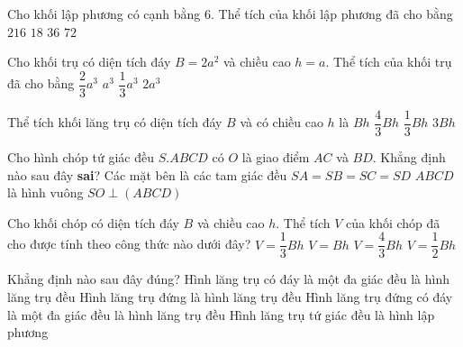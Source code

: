 \begin{ex}%
	 Cho khối lập phương có cạnh bằng $6$. Thể tích của khối lập phương đã cho bằng
	\choice 
		{\True $216$} 
		 {$18$}
		 {$36$}
		 {$72$}
\end{ex}

\begin{ex}%
	Cho khối trụ có diện tích đáy $B=2a^2$ và chiều cao $h=a$. Thể tích của khối trụ  đã cho bằng
	\choice 
		{$\dfrac{2}{3}a^3$} 
		 {$a^3$}
		{$\dfrac{1}{3}a^3$} 
		{\True  $2a^3$}
\end{ex}

\begin{ex}%
	Thể tích khối  lăng trụ có diện tích đáy $B$ và có chiều cao $h$ là
	 \choice
		{\True  $Bh$}
		 {$\dfrac{4}{3}Bh$}
		 {$\dfrac{1}{3}Bh$}
		{$3Bh$} 
\end{ex}

\begin{ex}%
	Cho hình chóp tứ giác đều $S.ABCD$ có $ O$ là giao điểm  $ AC$ và $BD$. Khẳng định nào sau đây \textbf{sai}?
	\choice 
		{\True Các mặt bên là các tam giác  đều}
		{$SA=SB=SC=SD$} 
		{$ABCD$  là hình vuông}
		{$SO \perp(ABCD)$} 
\end{ex}

\begin{ex}%
	Cho khối chóp có diện tích đáy $B$ và chiều cao $h$. Thể tích $V$ của khối chóp đã cho được  tính theo công thức nào dưới đây?
	 \choice
		{\True $V=\dfrac{1}{3}Bh$} 
		 {$V=Bh$}
		 {$V=\dfrac{4}{3}Bh$}
		 {$V=\dfrac{1}{2}Bh$}
\end{ex}

\begin{ex}%
	Khẳng định nào  sau đây đúng?
	\choice 
		{Hình lăng trụ có đáy là  một đa giác đều là hình lăng trụ đều}
		{Hình lăng trụ đứng là hình lăng trụ  đều}
		{\True Hình lăng trụ đứng có đáy là một đa giác  đều là hình lăng trụ đều}
		{Hình lăng  trụ tứ giác đều là hình lập phương}
\end{ex}

